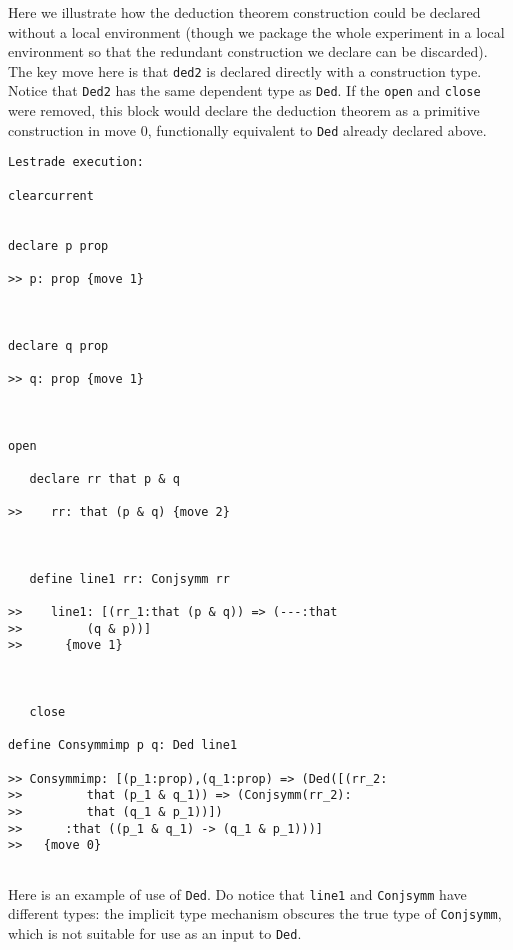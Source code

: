 \documentclass[12pt]{article}
\begin{document}
Here we illustrate how the deduction theorem construction could be declared without a local environment (though we package the whole experiment in a local environment so that the redundant  construction we declare can be discarded).  The key move here is that {\tt ded2} is declared directly with a construction type.   Notice that {\tt Ded2} has the same dependent type as {\tt Ded}.  If the {\tt open} and {\tt close} were removed, this block would declare the deduction theorem as a primitive construction in move 0, functionally equivalent to {\tt Ded} already declared above.

\begin{verbatim}Lestrade execution:

clearcurrent


declare p prop

>> p: prop {move 1}



declare q prop

>> q: prop {move 1}



open

   declare rr that p & q

>>    rr: that (p & q) {move 2}



   define line1 rr: Conjsymm rr

>>    line1: [(rr_1:that (p & q)) => (---:that
>>         (q & p))]
>>      {move 1}



   close

define Consymmimp p q: Ded line1

>> Consymmimp: [(p_1:prop),(q_1:prop) => (Ded([(rr_2:
>>         that (p_1 & q_1)) => (Conjsymm(rr_2):
>>         that (q_1 & p_1))])
>>      :that ((p_1 & q_1) -> (q_1 & p_1)))]
>>   {move 0}


\end{verbatim}

Here is an example of use of {\tt Ded}.  Do notice that {\tt line1} and {\tt Conjsymm} have different types:  the implicit type mechanism obscures the true type of {\tt Conjsymm}, which is not suitable for use as an input to {\tt Ded}.
\end{document}
